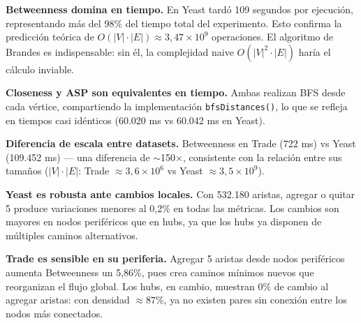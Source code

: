 \textbf{Betweenness domina en tiempo.} En Yeast tardó 109 segundos por ejecución,
representando más del 98\% del tiempo total del experimento. Esto confirma la
predicción teórica de $O(|V| \cdot |E|) \approx 3{,}47\times10^9$ operaciones.
El algoritmo de Brandes es indispensable: sin él, la complejidad naive
$O(|V|^2 \cdot |E|)$ haría el cálculo inviable.

\textbf{Closeness y ASP son equivalentes en tiempo.} Ambas realizan BFS desde
cada vértice, compartiendo la implementación \texttt{bfsDistances()}, lo que se
refleja en tiempos casi idénticos (60.020 ms vs 60.042 ms en Yeast).

\textbf{Diferencia de escala entre datasets.} Betweenness en Trade (722 ms) vs
Yeast (109.452 ms) — una diferencia de $\sim$150$\times$, consistente con la
relación entre sus tamaños ($|V|\cdot|E|$: Trade $\approx 3{,}6\times10^6$ vs
Yeast $\approx 3{,}5\times10^9$).

\textbf{Yeast es robusta ante cambios locales.} Con 532.180 aristas, agregar o
quitar 5 produce variaciones menores al 0,2\% en todas las métricas. Los cambios
son mayores en nodos periféricos que en hubs, ya que los hubs ya disponen de
múltiples caminos alternativos.

\textbf{Trade es sensible en su periferia.} Agregar 5 aristas desde nodos
periféricos aumenta Betweenness un 5,86\%, pues crea caminos mínimos nuevos que
reorganizan el flujo global. Los hubs, en cambio, muestran 0\% de cambio al agregar
aristas: con densidad $\approx 87\%$, ya no existen pares sin conexión entre los
nodos más conectados.
